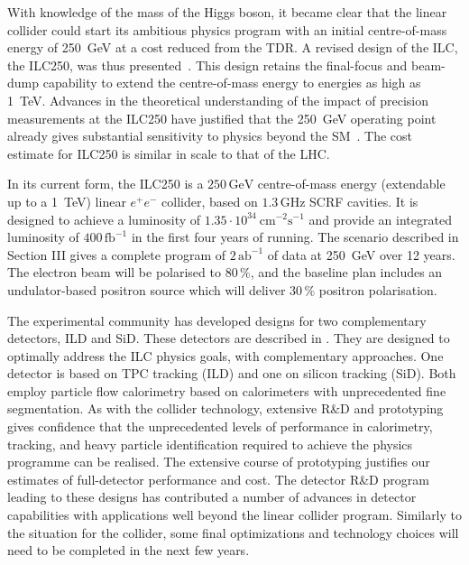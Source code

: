With knowledge of the mass of the Higgs boson, it became clear that
the 
linear collider could start its ambitious physics program
 with an initial centre-of-mass energy of 250~GeV at a cost
reduced from the TDR. A revised design of the ILC, the ILC250, was
thus  presented~\cite{Evans:2017rvt}.  This design  retains the final-focus and
beam-dump capability to extend the centre-of-mass energy to energies
as high as 1~TeV. Advances in the theoretical understanding of the impact of precision
measurements at the 
 ILC250 have justified that the 250~GeV operating point already gives
 substantial 
sensitivity to physics beyond the SM~\cite{Barklow:2017suo,Fujii:2017vwa}. 
 The cost estimate for ILC250 
  is similar in scale to that of the LHC.


In its current
form, the ILC250 is a $250\,{\mathrm{GeV}}$ centre-of-mass energy
(extendable up to a 1~TeV) linear $e^+e^-$ collider, based
on $1.3\,{\mathrm{GHz}}$ SCRF
cavities. It is designed to achieve a luminosity of $1.35\cdot
10^{34}~{\mathrm{cm}}^{-2}{\mathrm{s}}^{-1}$ and provide an integrated
luminosity of $400\,{\mathrm{fb}}^{-1}$ in the first four years of
running.  The scenario described in Section III gives a complete
program of $2\,{\mathrm{ab}}^{-1}$  of data at 250~GeV over 12 years.
The electron beam will be polarised to $80\,\%$, and the baseline plan includes an 
undulator-based
positron source which will  deliver
$30\,\%$ positron  polarisation. 


The experimental community has developed
designs for two complementary detectors, ILD and SiD.  These detectors
are described in 
 \cite{Behnke:2013lya}. They are designed to 
optimally address the
ILC physics goals, with complementary approaches. One detector is based on
TPC tracking (ILD) and one on silicon tracking (SiD).
Both employ particle flow calorimetry based on
calorimeters with unprecedented fine segmentation.
As with the collider technology, 
extensive R\&D and prototyping gives confidence that the
unprecedented levels of performance in calorimetry, tracking, and
heavy particle identification 
required to achieve the 
physics programme can be realised.
The  extensive course of
prototyping justifies our estimates of full-detector performance 
and cost.  
The detector R\&D program leading to these designs
has  contributed a number of advances in 
detector capabilities with applications well beyond the linear
collider program.    Similarly to the situation for the collider, some 
final optimizations and technology choices 
will need to be completed in the next few years. 


